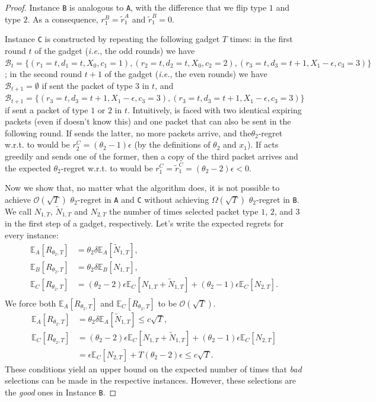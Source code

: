 \begin{proof}
    Instance \texttt{B} is analogous to \texttt{A}, with the difference that we flip type $1$ and type $2$. As a consequence, $r_1^B = \widetilde{r}_1^A$ and $\widetilde{r}_1^B = 0$.

    Instance \texttt{C} is constructed by repeating the following gadget $T$ times: in the first round $t$ of the gadget (\emph{i.e.}, the odd rounds) we have $\mathcal{B}_t = \{(r_1 = t, d_1 = t, X_0, c_1 = 1), (r_2 = t, d_2=t, X_0, c_2 = 2), (r_3=t, d_3=t+1, X_1-\epsilon, c_3 = 3)\}$; in the second round $t+1$ of the gadget (\emph{i.e.}, the even rounds) we have $\mathcal{B}_{t+1} = \emptyset$ if \alg sent the packet of type $3$ in $t$, and $\mathcal{B}_{t+1} = \{(r_3=t, d_3=t+1, X_1-\epsilon, c_3 = 3), (r_3=t, d_3=t+1, X_1-\epsilon, c_3 = 3)\}$ if \alg sent a packet of type $1$ or $2$ in $t$. Intuitively, \alg is faced with two identical expiring packets (even if \alg doesn't know this) and one packet that can also be sent in the following round. If \alg sends the latter, no more packets arrive, and the$\theta_2$-regret w.r.t. to \opt would be $r_2^C = (\theta_2-1)\epsilon$ (by the definitions of $\theta_2$ and $x_1$). If \alg acts greedily and sends one of the former, then a copy of the third packet arrives and the expected $\theta_2$-regret w.r.t. to \opt would be $r_1^C=\widetilde{r}_1^C=(\theta_2-2)\epsilon < 0$.

    Now we show that, no matter what the algorithm does, it is not possible to achieve $\mathcal{O}\left(\sqrt{T}\right)$ $\theta_2$-regret in \texttt{A} and \texttt{C} without achieving $\Omega\left(\sqrt{T}\right)$ $\theta_2$-regret in \texttt{B}. We call $N_{1,T}$, $\widetilde{N}_{1,T}$ and $N_{2,T}$ the number of times \alg selected packet type $1$, $2$, and $3$ in the first step of a gadget, respectively. Let's write the expected regrets for every instance:
    \begin{align*}
        \mathbb{E}_A[R_{\theta_2,T}] &= \theta_2\delta\mathbb{E}_A[\widetilde{N}_{1,T}], \\
        \mathbb{E}_B[R_{\theta_2,T}] &= \theta_2\delta\mathbb{E}_B[{N}_{1,T}], \\
        \mathbb{E}_C[R_{\theta_2,T}] &= (\theta_2-2)\epsilon\mathbb{E}_C[{N}_{1,T}+\widetilde{N}_{1,T}] + (\theta_2-1)\epsilon\mathbb{E}_C[N_{2,T}]. \\
    \end{align*}
    We force both $\mathbb{E}_A[R_{\theta_2,T}]$ and $\mathbb{E}_C[R_{\theta_2,T}]$ to be $\mathcal{O}\left(\sqrt{T}\right)$.
    \begin{align*}
        \mathbb{E}_A[R_{\theta_2,T}] &= \theta_2\delta\mathbb{E}_A[\widetilde{N}_{1,T}] \le c\sqrt{T}, \\
        \mathbb{E}_C[R_{\theta_2,T}] &= (\theta_2-2)\epsilon\mathbb{E}_C[{N}_{1,T}+\widetilde{N}_{1,T}] + (\theta_2-1)\epsilon\mathbb{E}_C[N_{2,T}] \\
        &= \epsilon\mathbb{E}_C[N_{2,T}]+T(\theta_2-2)\epsilon \le c\sqrt{T}.
    \end{align*}
    These conditions yield an upper bound on the expected number of times that \textit{bad} selections can be made in the respective instances. However, these selections are the \textit{good} ones in Instance \texttt{B}. 
    

\end{proof}
